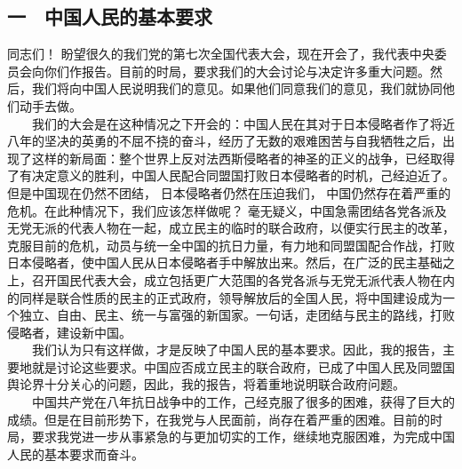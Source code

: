 \documentclass[cn,11pt,chinese]{elegantbook}
\def\myformat#1{\hfil\hfil #1}
\begin{document}
\subsection*{\myformat{一　中国人民的基本要求}}
同志们！ 盼望很久的我们党的第七次全国代表大会，现在开会了，我代表中央委员会向你们作报告。目前的时局，要求我们的大会讨论与决定许多重大问题。然后，我们将向中国人民说明我们的意见。如果他们同意我们的意见，我们就协同他们动手去做。\\
　　我们的大会是在这种情况之下开会的：中国人民在其对于日本侵略者作了将近八年的坚决的英勇的不屈不挠的奋斗，经历了无数的艰难困苦与自我牺牲之后，出现了这样的新局面：整个世界上反对法西斯侵略者的神圣的正义的战争，已经取得了有决定意义的胜利，中国人民配合同盟国打败日本侵略者的时机，己经迫近了。但是中国现在仍然不团结， 日本侵略者仍然在压迫我们， 中国仍然存在着严重的危机。在此种情况下，我们应该怎样做呢？ 毫无疑义，中国急需团结各党各派及无党无派的代表人物在一起，成立民主的临时的联合政府，以便实行民主的改革，克服目前的危机，动员与统一全中国的抗日力量，有力地和同盟国配合作战，打败日本侵略者，使中国人民从日本侵略者手中解放出来。然后，在广泛的民主基础之上，召开国民代表大会，成立包括更广大范围的各党各派与无党无派代表人物在内的同样是联合性质的民主的正式政府，领导解放后的全国人民，将中国建设成为一个独立、自由、民主、统一与富强的新国家。一句话，走团结与民主的路线，打败侵略者，建设新中国。\\
　　我们认为只有这样做，才是反映了中国人民的基本要求。因此，我的报告，主要地就是讨论这些要求。中国应否成立民主的联合政府，已成了中国人民及同盟国舆论界十分关心的问题，因此，我的报告，将着重地说明联合政府问题。\\
　　中国共产党在八年抗日战争中的工作，己经克服了很多的困难，获得了巨大的成绩。但是在目前形势下，在我党与人民面前，尚存在着严重的困难。目前的时局，要求我党进一步从事紧急的与更加切实的工作，继续地克服困难，为完成中国人民的基本要求而奋斗。\\
\end{document}

